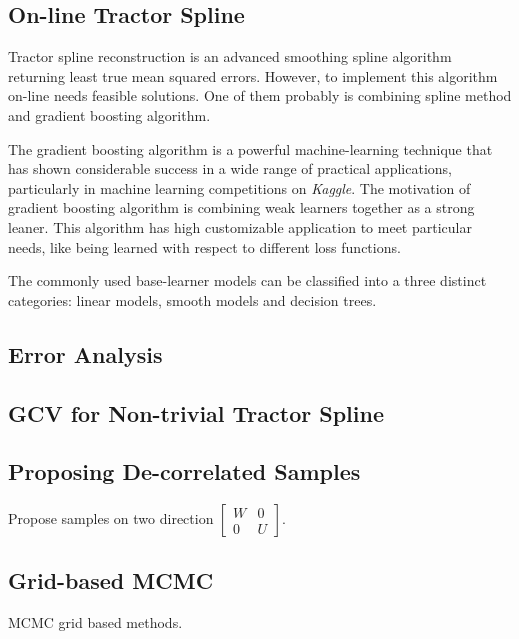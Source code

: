 

\subsection*{On-line Tractor Spline}

Tractor spline reconstruction is an advanced smoothing spline algorithm returning least true mean squared errors. However, to implement this algorithm on-line needs feasible solutions. One of them probably is combining spline method and gradient boosting algorithm. 

The gradient boosting algorithm is a powerful machine-learning technique that has shown considerable success in a wide range of practical applications, particularly in machine learning competitions on \textit{Kaggle}. The motivation of gradient boosting algorithm is combining weak learners together as a strong leaner. This algorithm has high customizable application to meet particular needs, like being learned with respect to different loss functions. 

The commonly used base-learner models can be classified into a three distinct categories: linear models, smooth models and decision trees. 


\subsection*{Error Analysis}


\subsection*{GCV for Non-trivial Tractor Spline}


\subsection*{Proposing De-correlated Samples}

Propose samples on two direction $\begin{bmatrix}
W & 0 \\ 0 & U
\end{bmatrix}$.


\subsection*{Grid-based MCMC}

MCMC grid based methods. 


